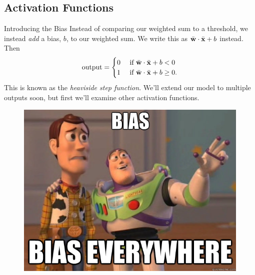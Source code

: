 \documentclass[xcolor=dvipsnames, fontsize=11pt, %
pagesize, %
parskip=half-, t]{beamer}
\begin{document}
\subsection{Activation Functions}
\begin{frame}[c]{Introducing the Bias}
Instead of comparing our weighted sum to a threshold, we instead \textit{add} a bias, $b$, to our weighted sum. We write this as $\bar{\bold{w}}\cdot \bar{\bold{x}}+b$ instead.  Then $$\text{output}=\begin{cases} 0 & \text{ if } \bar{\bold{w}}\cdot \bar{\bold{x}}+b<0 \\ 
1 & \text{ if } \bar{\bold{w}}\cdot \bar{\bold{x}}+b\ge 0. \end{cases}$$
This is known as the \textit{heaviside step function}. We'll extend our model to multiple outputs soon, but first we'll examine other activation functions. 
\begin{figure}
\includegraphics[scale=0.23]{bias.jpg} 
\end{figure}
\end{frame}
\end{document}
